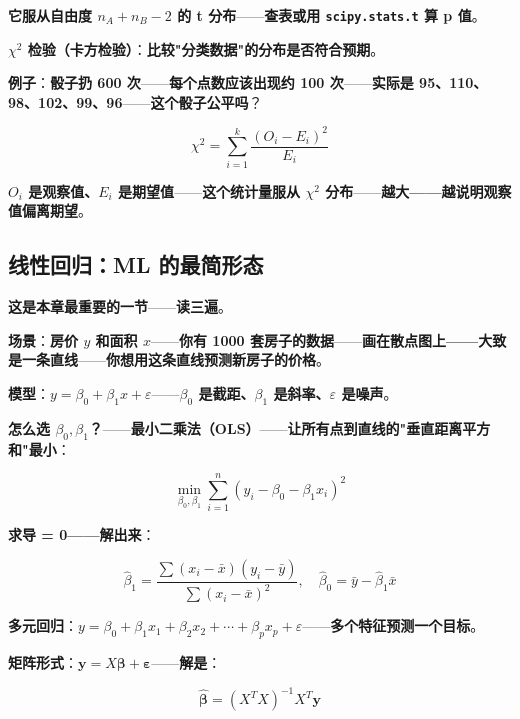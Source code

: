 \textbf{它服从自由度 $n_A + n_B - 2$ 的 t 分布}——\textbf{查表或用 \texttt{scipy.stats.t} 算 p 值}。

\textbf{$\chi^2$ 检验（卡方检验）}：\textbf{比较"分类数据"的分布是否符合预期}。

\textbf{例子}：\textbf{骰子扔 600 次}——\textbf{每个点数应该出现约 100 次}——\textbf{实际是 95、110、98、102、99、96}——\textbf{这个骰子公平吗}？

\begin{equation}
\chi^2 = \sum_{i=1}^k \frac{(O_i - E_i)^2}{E_i}
\end{equation}

\textbf{$O_i$ 是观察值、$E_i$ 是期望值}——\textbf{这个统计量服从 $\chi^2$ 分布}——\textbf{越大——越说明观察值偏离期望}。

\subsection{线性回归：ML 的最简形态}

\textbf{这是本章最重要的一节}——\textbf{读三遍}。

\textbf{场景}：\textbf{房价 $y$ 和面积 $x$}——\textbf{你有 1000 套房子的数据}——\textbf{画在散点图上——大致是一条直线}——\textbf{你想用这条直线预测新房子的价格}。

\textbf{模型}：\textbf{$y = \beta_0 + \beta_1 x + \varepsilon$}——\textbf{$\beta_0$ 是截距、$\beta_1$ 是斜率、$\varepsilon$ 是噪声}。

\textbf{怎么选 $\beta_0, \beta_1$？}——\textbf{最小二乘法（OLS）}——\textbf{让所有点到直线的"垂直距离平方和"最小}：

\begin{equation}
\min_{\beta_0, \beta_1} \sum_{i=1}^n (y_i - \beta_0 - \beta_1 x_i)^2
\end{equation}

\textbf{求导 = 0——解出来}：

\begin{equation}
\hat{\beta}_1 = \frac{\sum (x_i - \bar{x})(y_i - \bar{y})}{\sum (x_i - \bar{x})^2}, \quad \hat{\beta}_0 = \bar{y} - \hat{\beta}_1 \bar{x}
\end{equation}

\textbf{多元回归}：\textbf{$y = \beta_0 + \beta_1 x_1 + \beta_2 x_2 + \cdots + \beta_p x_p + \varepsilon$}——\textbf{多个特征预测一个目标}。

\textbf{矩阵形式}：\textbf{$\mathbf{y} = X\boldsymbol{\beta} + \boldsymbol{\varepsilon}$}——\textbf{解是}：

\begin{equation}
\boxed{\hat{\boldsymbol{\beta}} = (X^T X)^{-1} X^T \mathbf{y}}
\end{equation}

